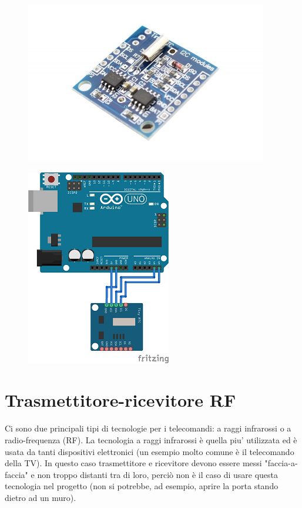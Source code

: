 \documentclass[12pt]{report}
\begin{document}
\begin{figure}
	\centering
	\begin{minipage}{0.5\textwidth}
		\centering
		\includegraphics[width=0.5\linewidth]{./img/tinyRTC.jpg}
		\label{fig:tinyRTC}
	\end{minipage}%
	\begin{minipage}{0.5\textwidth}
		\centering
		\includegraphics[width=0.5\linewidth]{./img/tinyRTC_uno.png}
		\label{fig:tinyRTC_uno}
	\end{minipage}
\end{figure}

%
\section{Trasmettitore-ricevitore RF}
%

Ci sono due principali tipi di tecnologie per i telecomandi: a raggi infrarossi o a radio-frequenza (RF).
La tecnologia a raggi infrarossi è quella piu' utilizzata ed è usata da tanti dispositivi elettronici (un esempio molto comune è il telecomando della TV). In questo caso trasmettitore e ricevitore devono essere messi "faccia-a-faccia" e non troppo distanti tra di loro, perciò non è il caso di usare questa tecnologia nel progetto (non si potrebbe, ad esempio, aprire la porta stando dietro ad un muro).
\end{document}

